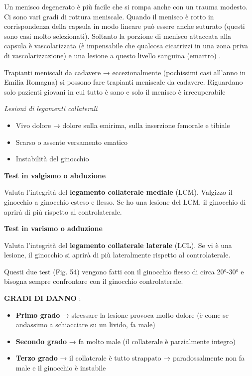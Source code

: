 \documentclass[]{article}
\begin{document}
Un menisco degenerato è più facile che si rompa anche con un trauma
modesto. Ci sono vari gradi di rottura meniscale. Quando il menisco è
rotto in corrispondenza della capsula in modo lineare può essere anche
suturato (questi sono casi molto selezionati). Soltanto la porzione di
menisco attaccata alla capsula è vascolarizzata (è impensabile che
qualcosa cicatrizzi in una zona priva di vascolarizzazione) e una
lesione a questo livello sanguina (emartro) .

Trapianti meniscali da cadavere → eccezionalmente (pochissimi casi
all'anno in Emilia Romagna) si possono fare trapianti meniscale da
cadavere. Riguardano solo pazienti giovani in cui tutto è sano e solo il
menisco è irrecuperabile

\emph{Lesioni di legamenti collaterali }

\begin{itemize}
\item
  Vivo dolore → dolore sulla emirima, sulla inserzione femorale e
  tibiale
\item
  Scarso o assente versamento ematico
\item
  Instabilità del ginocchio
\end{itemize}

\textbf{Test in valgismo o abduzione }

Valuta l'integrità del \textbf{legamento collaterale mediale} (LCM).
Valgizzo il ginocchio a ginocchio esteso e flesso. Se ho una lesione del
LCM, il ginocchio di aprirà di più rispetto al controlaterale.

\textbf{Test in varismo o adduzione }

Valuta l'integrità del \textbf{legamento collaterale laterale} (LCL). Se
vi è una lesione, il ginocchio si aprirà di più lateralmente rispetto al
controlaterale.

Questi due test (Fig. 54) vengono fatti con il ginocchio flesso di circa
20°-30° e bisogna sempre confrontare con il ginocchio controlaterale.

\textbf{GRADI DI DANNO} :

\begin{itemize}
\item
  \textbf{Primo grado} → stressare la lesione provoca molto dolore (è
  come se andassimo a schiacciare su un livido, fa male)
\item
  \textbf{Secondo grado} → fa molto male (il collaterale è parzialmente
  integro)
\item
  \textbf{Terzo grado} → il collaterale è tutto strappato →
  paradossalmente non fa male e il ginocchio è instabile
\end{itemize}
\end{document}
